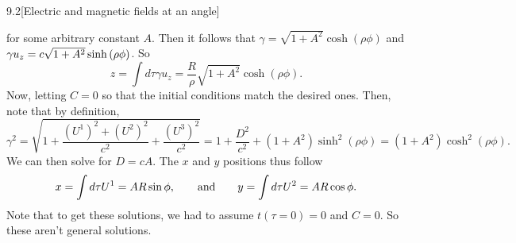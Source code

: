 \documentclass[12pt]{article}
\begin{document}
\begin{problem}{9.2}[Electric and magnetic fields at an angle]
\begin{solution}
for some arbitrary constant $A$. Then it follows that
$\gamma=\sqrt{1+A^2}\cosh(\rho\phi)$ and $\gamma
u_z=c\sqrt{1+A^2}\sinh\qty(\rho\phi)$. So
\begin{equation}
    z=\int d\tau\gamma u_z=\frac{R}{\rho}\sqrt{1+A^2}\cosh(\rho\phi).
\end{equation}
Now, letting $C=0$ so that the initial conditions match the desired ones. Then,
note that by definition,
\begin{equation}
    \gamma^2
    =\sqrt{1+\frac{(U^1)^2+(U^2)^2}{c^2}+\frac{(U^3)^2}{c^2}}
    =1+\frac{D^2}{c^2}+(1+A^2)\sinh^2(\rho\phi)
    =(1+A^2)\cosh^2(\rho\phi).
\end{equation}
We can then solve for $D=cA$. The $x$ and $y$ positions thus follow
\begin{equation}
    x=\int d\tau U^1
    =AR\sin\phi,\qquad\text{and}\qquad
    y=\int d\tau U^2=AR\cos\phi.
\end{equation}
Note that to get these solutions, we had to assume $t(\tau=0)=0$ and $C=0$. So
these aren't general solutions.
\end{solution}
\end{problem}
\newpage
\end{document}
